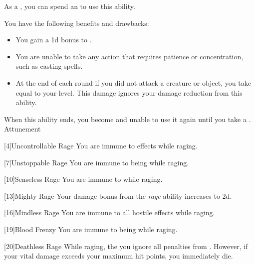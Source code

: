             As a , you can spend an  to use this ability.
            \begin{ability}
                \begin{spelleffects}
                    \spelleffect You have the following benefits and drawbacks:
                    \begin{itemize}
                        \item You gain a \plus1d bonus to .
                        \item You are unable to take any action that requires patience or concentration, such as casting spells.
                        \item At the end of each round if you did not attack a creature or object, you take  equal to your level.
                            This damage ignores your damage reduction from this ability.
                    \end{itemize}
                    \spellspecial When this ability ends, you become \fatigued and unable to use it again until you take a .
                    \spelldur Attunement
                \end{spelleffects}
            \end{ability}

            [4]{Uncontrollable Rage}
            You are immune to  effects while raging.

            [7]{Unstoppable Rage}
            You are immune to being  while raging.

            [10]{Senseless Rage}
            You are immune to   while raging.

            [13]{Mighty Rage}
            Your damage bonus from the \textit{rage} ability increases to \plus2d.

            [16]{Mindless Rage} 
            You are immune to all hostile  effects while raging.

            [19]{Blood Frenzy} 
            You are immune to being  while raging.

            [20]{Deathless Rage} 
            While raging, the you ignore all penalties from .
            However, if your vital damage exceeds your maximum hit points, you immediately die.

